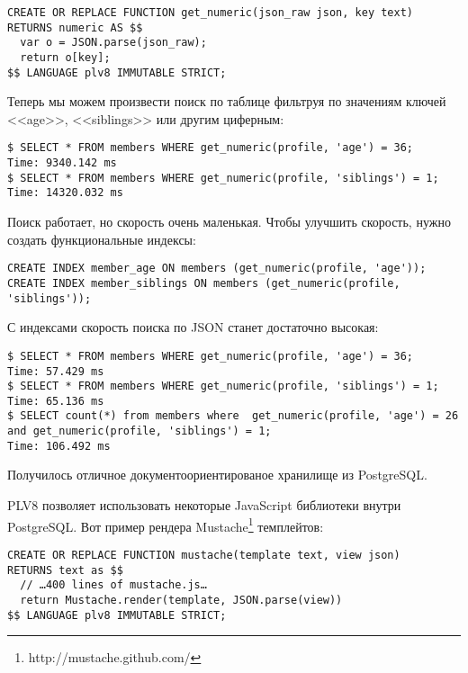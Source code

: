 \begin{lstlisting}[label=lst:plv8js11,caption=Функция для JSON]
CREATE OR REPLACE FUNCTION get_numeric(json_raw json, key text)
RETURNS numeric AS $$
  var o = JSON.parse(json_raw);
  return o[key];
$$ LANGUAGE plv8 IMMUTABLE STRICT;
\end{lstlisting}

Теперь мы можем произвести поиск по таблице фильтруя по значениям ключей <<age>>, <<siblings>> или другим циферным:

\begin{lstlisting}[label=lst:plv8js12,caption=Поиск по данным JSON]
$ SELECT * FROM members WHERE get_numeric(profile, 'age') = 36;
Time: 9340.142 ms
$ SELECT * FROM members WHERE get_numeric(profile, 'siblings') = 1;
Time: 14320.032 ms
\end{lstlisting}

Поиск работает, но скорость очень маленькая. Чтобы улучшить скорость, нужно создать функциональные индексы:

\begin{lstlisting}[label=lst:plv8js13,caption=Создание индексов]
CREATE INDEX member_age ON members (get_numeric(profile, 'age'));
CREATE INDEX member_siblings ON members (get_numeric(profile, 'siblings'));
\end{lstlisting}

С индексами скорость поиска по JSON станет достаточно высокая:

\begin{lstlisting}[label=lst:plv8js14,caption=Поиск по данным JSON с индексами]
$ SELECT * FROM members WHERE get_numeric(profile, 'age') = 36;
Time: 57.429 ms
$ SELECT * FROM members WHERE get_numeric(profile, 'siblings') = 1;
Time: 65.136 ms
$ SELECT count(*) from members where  get_numeric(profile, 'age') = 26 and get_numeric(profile, 'siblings') = 1;
Time: 106.492 ms
\end{lstlisting}

Получилось отличное документоориентированое хранилище из PostgreSQL.

PLV8 позволяет использовать некоторые JavaScript библиотеки внутри PostgreSQL. Вот пример рендера Mustache\footnote{http://mustache.github.com/} темплейтов:

\begin{lstlisting}[label=lst:plv8js15,caption=Функция для рендера Mustache темплейтов]
CREATE OR REPLACE FUNCTION mustache(template text, view json)
RETURNS text as $$
  // …400 lines of mustache.js…
  return Mustache.render(template, JSON.parse(view))
$$ LANGUAGE plv8 IMMUTABLE STRICT;
\end{lstlisting}

